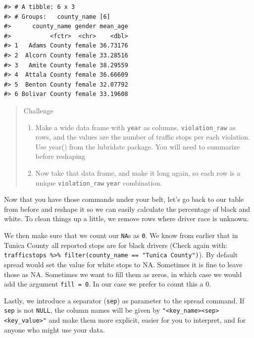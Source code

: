 \documentclass[]{book}
\newenvironment{Shaded}{\begin{snugshade}}{\end{snugshade}}
\newcommand{\KeywordTok}[1]{\textcolor[rgb]{0.13,0.29,0.53}{\textbf{#1}}}
\newcommand{\DataTypeTok}[1]{\textcolor[rgb]{0.13,0.29,0.53}{#1}}
\newcommand{\DecValTok}[1]{\textcolor[rgb]{0.00,0.00,0.81}{#1}}
\newcommand{\StringTok}[1]{\textcolor[rgb]{0.31,0.60,0.02}{#1}}
\newcommand{\OperatorTok}[1]{\textcolor[rgb]{0.81,0.36,0.00}{\textbf{#1}}}
\newcommand{\NormalTok}[1]{#1}
\theoremstyle{definition}
\theoremstyle{definition}
\theoremstyle{definition}
\theoremstyle{remark}
\begin{document}
\begin{verbatim}
#> # A tibble: 6 x 3
#> # Groups:   county_name [6]
#>      county_name gender mean_age
#>           <fctr>  <chr>    <dbl>
#> 1   Adams County female 36.73176
#> 2  Alcorn County female 33.28516
#> 3   Amite County female 38.29559
#> 4  Attala County female 36.66609
#> 5  Benton County female 32.07792
#> 6 Bolivar County female 33.19608
\end{verbatim}

\begin{quote}
Challenge

\begin{enumerate}
\def\labelenumi{\arabic{enumi}.}
\item
  Make a wide data frame with \texttt{year} as columns,
  \texttt{violation\_raw} as rows, and the values are the number of
  traffic stops per each violation. Use year() from the lubridate
  package. You will need to summarize before reshaping
\item
  Now take that data frame, and make it long again, so each row is a
  unique \texttt{violation\_raw} \texttt{year} combination.
\end{enumerate}
\end{quote}

Now that you have those commands under your belt, let's go back to our
table from before and reshape it so we can easily calculate the
percentage of black and white. To clean things up a little, we remove
rows where driver race is unknown.

We then make sure that we count our \texttt{NA}s as \texttt{0}. We know
from earlier that in Tunica County all reported stops are for black
drivers (Check again with:
\texttt{trafficstops\ \%\textgreater{}\%\ filter(county\_name\ ==\ "Tunica\ County")}).
By default spread would set the value for white stops to NA. Sometimes
it is fine to leave those as NA. Sometimes we want to fill them as
zeros, in which case we would add the argument \texttt{fill\ =\ 0}. In
our case we prefer to count this a 0.

Lastly, we introduce a separator (\texttt{sep}) as parameter to the
spread command. If \texttt{sep} is not \texttt{NULL}, the column names
will be given by
\texttt{"\textless{}key\_name\textgreater{}\textless{}sep\textgreater{}\textless{}key\_value\textgreater{}"}
and make them more explicit, easier for you to interpret, and for anyone
who might use your data.

\begin{Shaded}
\end{Shaded}
\end{document}

